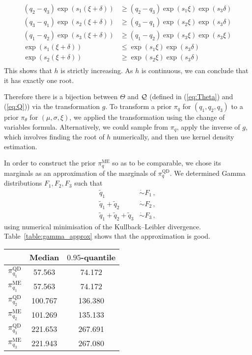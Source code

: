 %
\begin{align*}
(q_2 - q_3) \exp(s_1 (\xi + \delta)) &\geq
(q_2 - q_3) \exp(s_1 \xi) \exp(s_3 \delta)\\
(q_3 - q_1) \exp(s_2 (\xi + \delta)) &\geq
(q_3 - q_1) \exp(s_2 \xi) \exp(s_3 \delta)\\
(q_1 - q_2) \exp(s_3 (\xi + \delta)) &\geq
(q_1 - q_2) \exp(s_3 \xi) \exp(s_3 \xi)\\
\exp(s_1 (\xi + \delta)) &\leq \exp(s_1 \xi) \exp(s_3 \delta)\\
\exp(s_2 (\xi + \delta)) &\geq \exp(s_2 \xi) \exp(s_3 \delta)\\
\end{align*}
%
This shows that $h$ is strictly increasing.
As $h$ is continuous, we can conclude that it has exactly one root.
%

%
Therefore there is a bijection between  $\Theta$ and ${\cal Q}$
(defined in (\ref{eq:Theta}) and (\ref{eq:Q})) via the transformation $g$.
To transform a prior $\pi_q$ for $(q_1, q_2, q_3)$ to a prior
$\pi_\theta$ for $(\mu, \sigma, \xi)$,
we applied the transformation using the change of variables formula.
Alternatively, we could sample from $\pi_q$,
apply the inverse of $g$, which involves finding the root of $h$ numerically,
and then use kernel density estimation.
%



In order to construct the prior $\pi^{\text{ME}}_q$
so as to be comparable, we chose its marginals
as an approximation of the marginals of $\pi^{\text{QD}}_q$.
We determined Gamma distributions
$F_1, F_2, F_3$ such that
%
\begin{align*}
\tilde{q}_1 &\mathrel{\dot\sim} F_1 \,,\\
\tilde{q}_1 + \tilde{q}_2 &\mathrel{\dot\sim} F_2 \,,\\
\tilde{q}_1 + \tilde{q}_2 + \tilde{q}_3 &\mathrel{\dot\sim}F_3 \,,
\end{align*}
%
using numerical minimisation of the Kullback–Leibler divergence.
Table~\ref{table:gamma_approx} shows that the approximation is good.
%
\begin{table*}
	\centering
	\renewcommand{\arraystretch}{1.2}
	\begin{tabular}{@{}ccc@{}}
		\toprule[0.1em]
		&Median &$0.95$-quantile\\
		\midrule[0.1em]
		$\pi^{\text{QD}}_{q_1}$ &57.563 &74.172\\
		$\pi^{\text{ME}}_{q_1}$ &57.563 &74.172\\
		\midrule[0.05em]
		$\pi^{\text{QD}}_{q_2}$ &100.767 &136.380\\
		$\pi^{\text{ME}}_{q_2}$ &101.269 &135.133\\
		\midrule[0.05em]
		$\pi^{\text{QD}}_{q_3}$ &221.653 &267.691\\
		$\pi^{\text{ME}}_{q_3}$ &221.943 &267.080\\
		\bottomrule[0.1em]
	\end{tabular}
	\caption{Comparison of the marginals of $q_1, q_2, q_3$
		for pseudo-data simulation study}
	\label{table:gamma_approx}
\end{table*}


